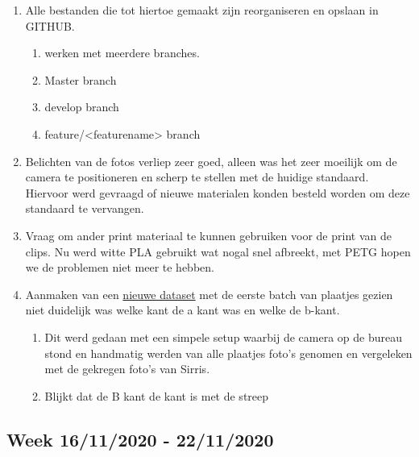 \documentclass{scrartcl}
\begin{document}
\begin{enumerate}[1]
\item Alle bestanden die tot hiertoe gemaakt zijn reorganiseren en opslaan in GITHUB.
	\begin{enumerate}[a]
	\item werken met meerdere branches. 
	\item Master branch 
	\item develop branch
	\item feature/\textless{}featurename\textgreater{} branch
	\end{enumerate}
\item Belichten van de fotos verliep zeer goed, alleen was het zeer moeilijk om de camera te positioneren en scherp te stellen met de huidige standaard. Hiervoor werd gevraagd of nieuwe materialen konden besteld worden om deze standaard te vervangen.
\item Vraag om ander print materiaal te kunnen gebruiken voor de print van de clips. Nu werd witte PLA gebruikt wat nogal snel afbreekt, met PETG hopen we de problemen niet meer te hebben.
\item Aanmaken van een \href{../../Vision/Dataset/handmade_datasets/Second_handmade_dataset.tex}{nieuwe dataset} met de eerste batch van plaatjes gezien niet duidelijk was welke kant de a kant was en welke de b-kant.
	\begin{enumerate}[a]
	\item Dit werd gedaan met een simpele setup waarbij de camera op de bureau stond en handmatig werden van alle plaatjes foto's genomen en vergeleken met de gekregen foto's van Sirris.
	\item Blijkt dat de B kant de kant is met de streep
	\end{enumerate}
\end{enumerate}


\subsection{Week 16/11/2020 - 22/11/2020}
\end{document}
